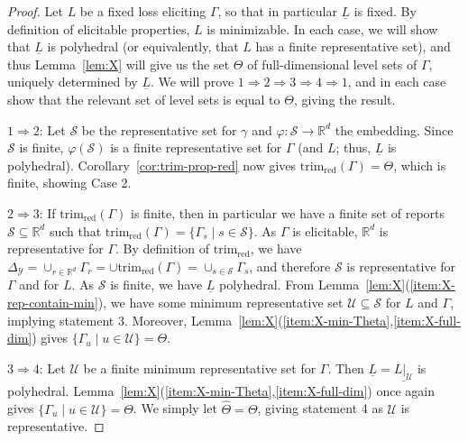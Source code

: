 \documentclass[11pt]{article}
\newcommand{\Comments}{1}
\newcommand{\mytodo}[2]{\ifnum\Comments=1%
  \todo[linecolor=#1!80!black,backgroundcolor=#1,bordercolor=#1!80!black]{#2}\fi}
\newcommand{\raft}[1]{\mytodo{green!20!white}{RF: #1}}
\newcommand{\jessiet}[1]{\mytodo{teal!20!white}{JF: #1}}
\newcommand{\reals}{\mathbb{R}}
\newcommand{\simplex}{\Delta_\Y}
\newcommand{\Sc}{\mathcal{S}}
\newcommand{\U}{\mathcal{U}}
\newcommand{\Y}{\mathcal{Y}}
\newcommand{\risk}[1]{\underline{#1}}
\newcommand{\red}{\mathrm{red}}
\newcommand{\trimred}{\mathrm{trim}_\red}
\begin{document}
\begin{proof}
  Let $L$ be a fixed loss eliciting $\Gamma$, so that in particular $\risk L$ is fixed.
  By definition of elicitable properties, $L$ is minimizable.
  In each case, we will show that $\risk L$ is polyhedral (or equivalently, that $L$ has a finite representative set), and thus Lemma~\ref{lem:X} will give us the set $\Theta$ of full-dimensional level sets of $\Gamma$, uniquely determined by $\risk L$.
  We will prove $1 \Rightarrow 2 \Rightarrow 3 \Rightarrow 4 \Rightarrow 1$, and in each case show that the relevant set of level sets is equal to $\Theta$, giving the result.

  $1 \Rightarrow 2$:
  Let $\Sc$ be the representative set for $\gamma$ and $\varphi:\Sc\to\reals^d$ the embedding.
  Since $\Sc$ is finite, $\varphi(\Sc)$ is a finite representative set for $\Gamma$ (and $L$; thus, $\risk L$ is polyhedral).
  Corollary~\ref{cor:trim-prop-red} now gives $\trimred(\Gamma) = \Theta$, which is finite, showing Case 2.

  $2 \Rightarrow 3$:
  If $\trimred(\Gamma)$ is finite, then in particular we have a finite set of reports $\Sc \subseteq \reals^d$ such that $\trimred(\Gamma) = \{\Gamma_s \mid s\in\Sc\}$.
  As $\Gamma$ is elicitable, $\reals^d$ is representative for $\Gamma$.
  By definition of $\trimred$, we have $\simplex = \cup_{r\in\reals^d} \Gamma_r = \cup \trimred(\Gamma) = \cup_{s\in\Sc} \Gamma_s$, and therefore $\Sc$ is representative for $\Gamma$ and for $L$.
  As $\Sc$ is finite, we have $\risk L$ polyhedral.
  From Lemma~\ref{lem:X}(\ref{item:X-rep-contain-min}), we have some minimum representative set $\U\subseteq\Sc$ for $L$ and $\Gamma$, implying statement 3.
  Moreover, Lemma~\ref{lem:X}(\ref{item:X-min-Theta},\ref{item:X-full-dim}) gives $\{\Gamma_u \mid u\in\U\} = \Theta$.

  $3 \Rightarrow 4$:
  Let $\U$ be a finite minimum representative set for $\Gamma$.
  Then $\risk L = \risk{L|_\U}$ is polyhedral.
  Lemma~\ref{lem:X}(\ref{item:X-min-Theta},\ref{item:X-full-dim}) once again gives $\{\Gamma_u \mid u\in\U\} = \Theta$.
  We simply let $\hat\Theta = \Theta$, giving statement 4 as $\U$ is representative.


\end{proof}
\end{document}
